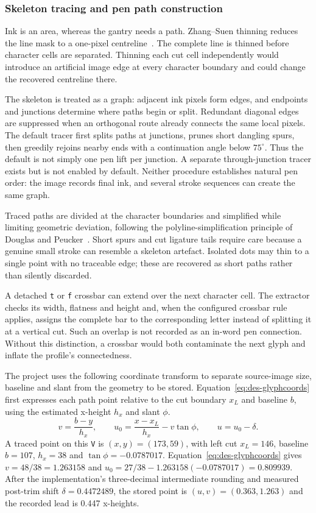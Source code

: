 \subsubsection{Skeleton tracing and pen path construction}
Ink is an area, whereas the gantry needs a path. Zhang--Suen thinning reduces the line mask to a one-pixel centreline~\cite[p.~237]{zhang1984}. The complete line is thinned before character cells are separated. Thinning each cut cell independently would introduce an artificial image edge at every character boundary and could change the recovered centreline there.

The skeleton is treated as a graph: adjacent ink pixels form edges, and endpoints and junctions determine where paths begin or split. Redundant diagonal edges are suppressed when an orthogonal route already connects the same local pixels. The default tracer first splits paths at junctions, prunes short dangling spurs, then greedily rejoins nearby ends with a continuation angle below $75^\circ$. Thus the default is not simply one pen lift per junction. A separate through-junction tracer exists but is not enabled by default. Neither procedure establishes natural pen order: the image records final ink, and several stroke sequences can create the same graph.

Traced paths are divided at the character boundaries and simplified while limiting geometric deviation, following the polyline-simplification principle of Douglas and Peucker~\cite[page to verify]{douglas1973}. Short spurs and cut ligature tails require care because a genuine small stroke can resemble a skeleton artefact. Isolated dots may thin to a single point with no traceable edge; these are recovered as short paths rather than silently discarded.

A detached \texttt{t} or \texttt{f} crossbar can extend over the next character cell. The extractor checks its width, flatness and height and, when the configured crossbar rule applies, assigns the complete bar to the corresponding letter instead of splitting it at a vertical cut. Such an overlap is not recorded as an in-word pen connection. Without this distinction, a crossbar would both contaminate the next glyph and inflate the profile's connectedness.

The project uses the following coordinate transform to separate source-image size, baseline and slant from the geometry to be stored. Equation~\ref{eq:des-glyphcoords} first expresses each path point relative to the cut boundary $x_L$ and baseline $b$, using the estimated x-height $h_x$ and slant $\phi$.
\begin{equation}
v=\frac{b-y}{h_x},\qquad
u_0=\frac{x-x_L}{h_x}-v\tan\phi,\qquad u=u_0-\delta.
\label{eq:des-glyphcoords}
\end{equation}
A traced point on this \texttt{V} is $(x,y)=(173,59)$, with left cut $x_L=146$, baseline $b=107$, $h_x=38$ and $\tan\phi=-0.0787017$. Equation~\ref{eq:des-glyphcoords} gives $v=48/38=1.263158$ and $u_0=27/38-1.263158(-0.0787017)=0.809939$. After the implementation's three-decimal intermediate rounding and measured post-trim shift $\delta=0.4472489$, the stored point is $(u,v)=(0.363,1.263)$ and the recorded lead is 0.447 x-heights.

